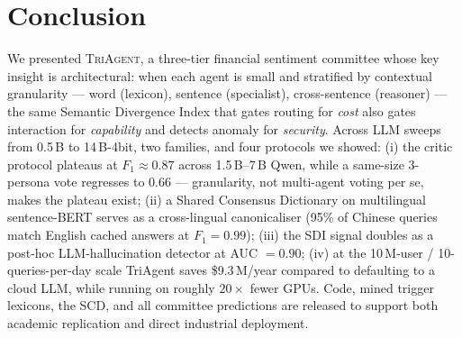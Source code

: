 \section{Conclusion}
\label{sec:conclusion}

We presented \textsc{TriAgent}, a three-tier financial sentiment
committee whose key insight is architectural: when each agent is
small and stratified by contextual granularity --- word (lexicon),
sentence (specialist), cross-sentence (reasoner) --- the same
Semantic Divergence Index that gates routing for \emph{cost} also
gates interaction for \emph{capability} and detects anomaly for
\emph{security}. Across LLM sweeps from 0.5\,B to 14\,B-4bit, two
families, and four protocols we showed:
(i) the critic protocol plateaus at $F_1\!\approx\!0.87$ across
1.5\,B--7\,B Qwen, while a same-size 3-persona vote regresses to
$0.66$ --- granularity, not multi-agent voting per se, makes the
plateau exist;
(ii) a Shared Consensus Dictionary on multilingual sentence-BERT
serves as a cross-lingual canonicaliser (95\% of Chinese queries
match English cached answers at $F_1\!=\!0.99$);
(iii) the SDI signal doubles as a post-hoc LLM-hallucination
detector at AUC $=0.90$;
(iv) at the 10\,M-user / 10-queries-per-day scale TriAgent saves
\$9.3\,M/year compared to defaulting to a cloud LLM, while running
on roughly $20\times$ fewer GPUs. Code, mined trigger lexicons, the
SCD, and all committee predictions are released to support both
academic replication and direct industrial deployment.
